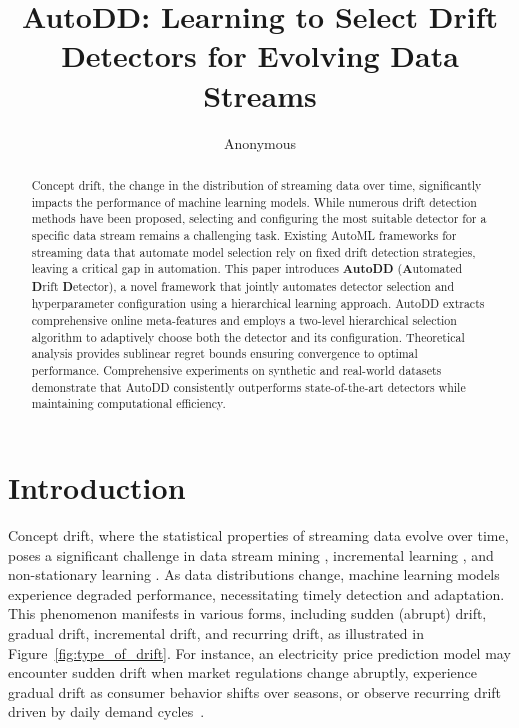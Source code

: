 \documentclass{article}
\title{AutoDD: Learning to Select Drift Detectors for Evolving Data Streams}
\author{
Anonymous
}
\begin{document}
\maketitle

\begin{abstract}
Concept drift, the change in the distribution of streaming data over time, significantly impacts the performance of machine learning models. While numerous drift detection methods have been proposed, selecting and configuring the most suitable detector for a specific data stream remains a challenging task. Existing AutoML frameworks for streaming data that automate model selection rely on fixed drift detection strategies, leaving a critical gap in automation. This paper introduces \textbf{AutoDD} (\textbf{A}utomated \textbf{D}rift \textbf{D}etector), a novel framework that jointly automates detector selection and hyperparameter configuration using a hierarchical learning approach. AutoDD extracts comprehensive online meta-features and employs a two-level hierarchical selection algorithm to adaptively choose both the detector and its configuration. Theoretical analysis provides sublinear regret bounds ensuring convergence to optimal performance. Comprehensive experiments on synthetic and real-world datasets demonstrate that AutoDD consistently outperforms state-of-the-art detectors while maintaining computational efficiency.
\end{abstract}

\section{Introduction}

Concept drift, where the statistical properties of streaming data evolve over time, poses a significant challenge in data stream mining \cite{Gama2014Survey}, incremental learning \cite{Losing2018IncrementalOnline}, and non-stationary learning \cite{Lu2019Learning}. As data distributions change, machine learning models experience degraded performance, necessitating timely detection and adaptation. This phenomenon manifests in various forms, including sudden (abrupt) drift, gradual drift, incremental drift, and recurring drift, as illustrated in Figure~\ref{fig:type_of_drift}. For instance, an electricity price prediction model may encounter sudden drift when market regulations change abruptly, experience gradual drift as consumer behavior shifts over seasons, or observe recurring drift driven by daily demand cycles~\cite{Lu2019Learning}.
\end{document}
